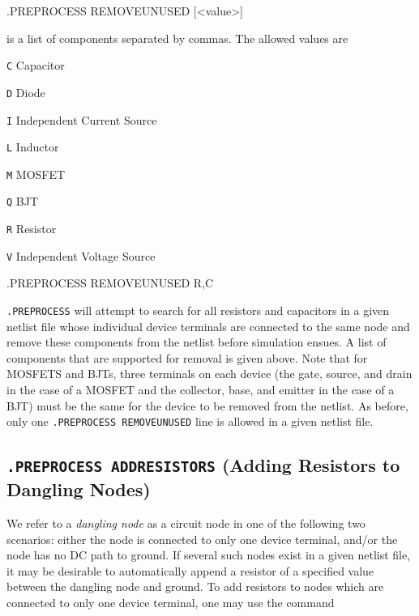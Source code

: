 \begin{Command}

\format
.PREPROCESS REMOVEUNUSED [<value>]

\arguments

\begin{Arguments}


is a list of components separated by commas.  The allowed values are 
\begin{basedescript}{
    \desclabelstyle{\multilinelabel}
    \desclabelwidth{1in}
    \renewcommand{\makelabel}[1]{\tt #1\hfill}}
\item[\tt C] Capacitor
\item[\tt D] Diode
\item[\tt I] Independent Current Source
\item[\tt L] Inductor
\item[\tt M] MOSFET
\item[\tt Q] BJT
\item[\tt R] Resistor
\item[\tt V] Independent Voltage Source
\end{basedescript}

\end{Arguments}

\examples
.PREPROCESS REMOVEUNUSED R,C

\normalfont
\texttt{.PREPROCESS} will attempt to search for all resistors and capacitors in
a given netlist file whose individual device terminals are connected to the
same node and remove these components from the netlist before simulation
ensues.  A list of components that are supported for removal is given above.
Note that for MOSFETS and BJTs, three terminals on each device (the gate,
source, and drain in the case of a MOSFET and the collector, base, and emitter
in the case of a BJT) must be the same for the device to be removed from the
netlist.  As before, only one \texttt{.PREPROCESS REMOVEUNUSED} line is allowed
in a given netlist file.

\end{Command}

\newpage
\subsection{\texttt {.PREPROCESS ADDRESISTORS} (Adding Resistors to Dangling Nodes)}

We refer to a \emph{dangling node} as a circuit node in one of the following
two scenarios:  either the node is connected to only one device terminal,
and/or the node has no DC path to ground.  If several such nodes exist in a
given netlist file, it may be desirable to automatically append a resistor of a
specified value between the dangling node and ground.  To add resistors to
nodes which are connected to only one device terminal, one may use the command

